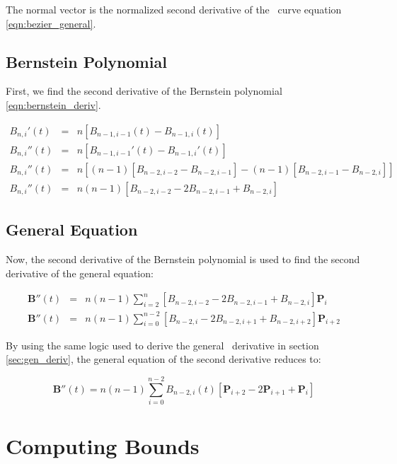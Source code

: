 \documentclass[oneside,usepdftitle=true]{article}
\begin{document}
The normal vector is the normalized second derivative of the \Bezier\ curve equation \eqref{eqn:bezier_general}.

\subsection{Bernstein Polynomial}
First, we find the second derivative of the Bernstein polynomial \eqref{eqn:bernstein_deriv}.

\begin{eqnarray}
	\nonumber B_{n,i}'(t) &=& n [ B_{n-1,i-1}(t) - B_{n-1,i}(t) ] \\
	\nonumber B_{n,i}''(t) &=& n[ B_{n-1,i-1}'(t) - B_{n-1,i}'(t) ] \\
	\nonumber B_{n,i}''(t) &=&  n[(n-1)[B_{n-2,i-2} - B_{n-2,i-1}] - (n-1)[B_{n-2,i-1} - B_{n-2,i}]] \\
	\label{eqn:bernstein_second_deriv}
	B_{n,i}''(t) &=& n (n-1) [B_{n-2,i-2} - 2 B_{n-2,i-1} + B_{n-2,i}]
\end{eqnarray}

\subsection{General Equation}

Now, the second derivative of the Bernstein polynomial is used to find the second derivative of the general equation:

\begin{eqnarray}
	\nonumber \mathbf{B}''(t) &=& n (n-1) \sum_{i=2}^n [B_{n-2,i-2} - 2 B_{n-2,i-1} + B_{n-2,i}] \mathbf{P}_i \\
	\label{eqn:bezier_second_der_close}
	\mathbf{B}''(t) &=& n (n-1) \sum_{i=0}^{n-2} [B_{n-2,i} - 2 B_{n-2,i+1} + B_{n-2,i+2}] \mathbf{P}_{i+2}
\end{eqnarray}

By using the same logic used to derive the general \Bezier\ derivative in section \ref{sec:gen_deriv}, the general equation of the second derivative reduces to:

\begin{equation}\label{eqn:bezier_second_deriv}
	\mathbf{B}''(t) = n (n - 1) \sum_{i=0}^{n-2} B_{n-2,i}(t) [ \mathbf{P}_{i+2} - 2\mathbf{P}_{i+1} + \mathbf{P}_i ]
\end{equation}





\section{Computing Bounds}
\end{document}
